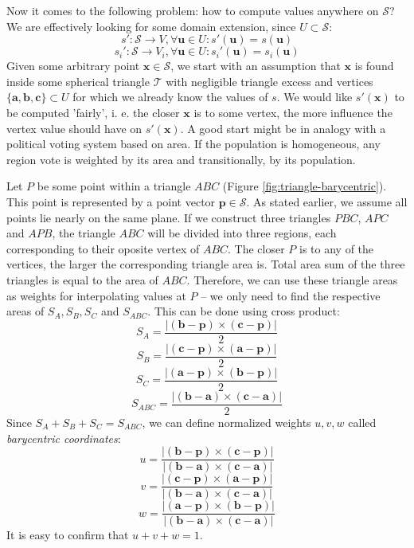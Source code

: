 Now it comes to the following problem: how to compute values anywhere on $\mathcal{S}$? We are effectively looking for some domain extension, since $U\subset\mathcal{S}$:
$$s':\mathcal{S}\rightarrow V, \forall \mathbf{u}\in U:s'(\mathbf{u})=s(\mathbf{u})$$
$$s_i':\mathcal{S}\rightarrow V_i, \forall \mathbf{u}\in U:s_i'(\mathbf{u})=s_i(\mathbf{u})$$
Given some arbitrary point $\mathbf{x}\in\mathcal{S}$, we start with an assumption that $\mathbf{x}$ is found inside some spherical triangle $\mathcal{T}$ with negligible triangle excess and vertices $\{\mathbf{a}, \mathbf{b}, \mathbf{c}\} \subset U$ for which we already know the values of $s$. We would like $s'(\mathbf{x})$ to be computed 'fairly', i. e. the closer $\mathbf{x}$ is to some vertex, the more influence the vertex value should have on $s'(\mathbf{x})$. A good start might be in analogy with a political voting system based on area. If the population is homogeneous, any region vote is weighted by its area and transitionally, by its population.

Let $P$ be some point within a triangle $ABC$ (Figure \ref{fig:triangle-barycentric}). This point is represented by a point vector $\mathbf{p}\in\mathcal{S}$. As stated earlier, we assume all points lie nearly on the same plane. If we construct three triangles $PBC$, $APC$ and $APB$, the triangle $ABC$ will be divided into three regions, each corresponding to their oposite vertex of $ABC$. The closer $P$ is to any of the vertices, the larger the corresponding triangle area is. Total area sum of the three triangles is equal to the area of $ABC$. Therefore, we can use these triangle areas as weights for interpolating values at $P$ -- we only need to find the respective areas of $S_A, S_B, S_C$ and $S_{ABC}$. This can be done using cross product:
$$S_A=\frac{|(\mathbf{b}-\mathbf{p})\times(\mathbf{c}-\mathbf{p})|}{2}$$
$$S_B=\frac{|(\mathbf{c}-\mathbf{p})\times(\mathbf{a}-\mathbf{p})|}{2}$$
$$S_C=\frac{|(\mathbf{a}-\mathbf{p})\times(\mathbf{b}-\mathbf{p})|}{2}$$
$$S_{ABC}=\frac{|(\mathbf{b}-\mathbf{a})\times(\mathbf{c}-\mathbf{a})|}{2}$$
Since $S_A+S_B+S_C=S_{ABC}$, we can define normalized weights $u, v, w$ called \textit{barycentric coordinates}:
$$u=\frac{|(\mathbf{b}-\mathbf{p})\times(\mathbf{c}-\mathbf{p})|}{|(\mathbf{b}-\mathbf{a})\times(\mathbf{c}-\mathbf{a})|}$$
$$v=\frac{|(\mathbf{c}-\mathbf{p})\times(\mathbf{a}-\mathbf{p})|}{|(\mathbf{b}-\mathbf{a})\times(\mathbf{c}-\mathbf{a})|}$$
$$w=\frac{|(\mathbf{a}-\mathbf{p})\times(\mathbf{b}-\mathbf{p})|}{|(\mathbf{b}-\mathbf{a})\times(\mathbf{c}-\mathbf{a})|}$$
It is easy to confirm that $u+v+w=1$.

